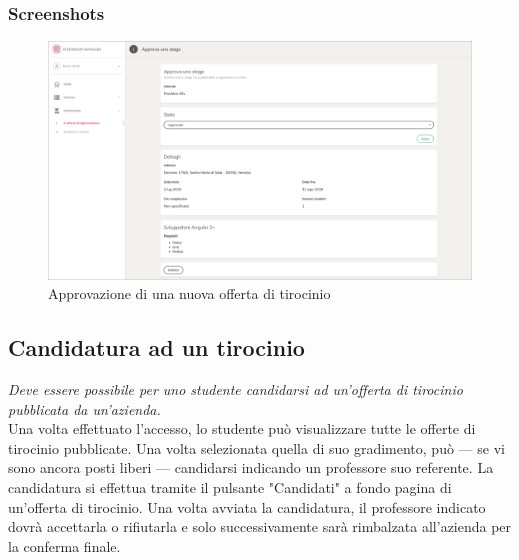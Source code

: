 \subsubsection{Screenshots}
\begin{figure}[H]
	\centering
	\includegraphics[width=1\textwidth]{Chapter3/Figs/screenshots/internshipapprove}     
	\caption[Screenshot: approvazione di una nuova offerta di tirocinio]{Approvazione di una nuova offerta di tirocinio}
	\label{fig:screenshot:3}
\end{figure}

\pagebreak
\subsection{Candidatura ad un tirocinio}\label{sec:candidatura-ad-un-tirocinio}

\textit{Deve essere possibile per uno studente candidarsi ad un'offerta di tirocinio pubblicata da un'azienda.} \\

\noindent
Una volta effettuato l'accesso, lo studente può visualizzare tutte le offerte di tirocinio pubblicate. Una volta selezionata quella di suo gradimento, può --- se vi sono ancora posti liberi --- candidarsi indicando un professore suo referente. La candidatura si effettua tramite il pulsante "Candidati" a fondo pagina di un'offerta di tirocinio. Una volta avviata la candidatura, il professore indicato dovrà accettarla o rifiutarla e solo successivamente sarà rimbalzata all'azienda per la conferma finale.

